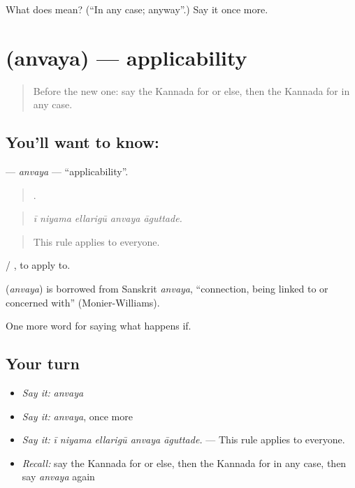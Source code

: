 \begin{tcolorbox}[breakable,colback=teal!4,colframe=teal!35!black,title={Before you move on}]
What does  mean? (\textquotedblleft{}In any case; anyway\textquotedblright{}.) Say it once more.
\end{tcolorbox}
\section[\texorpdfstring{\kn{ಅನ್ವಯ} (anvaya)}{ಅನ್ವಯ (anvaya)}]{ (anvaya) — applicability}

\label{lesson:KA-C428-anvaya}



\begin{quote}
Before the new one: say the Kannada for or else, then the Kannada for in any case.
\end{quote}

\subsection*{You'll want to know: }
\textbf{} — \emph{anvaya} — \textquotedblleft{}applicability\textquotedblright{}.

\begin{quote}
    .
\end{quote}

\begin{quote}
\emph{ī niyama ellarigū anvaya āguttade.}
\end{quote}

\begin{quote}
This rule applies to everyone.
\end{quote}

  / , to apply to.

\begin{cousinweb}
\textbf{} (\emph{anvaya}) is borrowed from Sanskrit \emph{anvaya}, \textquotedblleft{}connection, being linked to or concerned with\textquotedblright{} (Monier-Williams).
\end{cousinweb}

\begin{grammarlens}[title={What you've built}]
One more word for saying what happens if.
\end{grammarlens}

\subsection*{Your turn}
\begin{itemize}
\raggedright
  \item \emph{Say it:} \emph{anvaya}
  \item \emph{Say it:} \emph{anvaya}, once more
  \item \emph{Say it:} \emph{ī niyama ellarigū anvaya āguttade.} — This rule applies to everyone.
  \item \emph{Recall:} say the Kannada for or else, then the Kannada for in any case, then say \emph{anvaya} again
\end{itemize}


